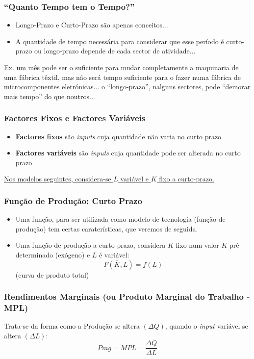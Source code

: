 \begin{frame}
	\frametitle{``Quanto Tempo tem o Tempo?''}
	\begin{itemize}
		\item Longo-Prazo e Curto-Prazo s\~ao apenas conceitos...
		\item A quantidade de tempo necess\'aria para considerar que esse per\'iodo \'e curto-prazo ou longo-prazo depende de cada sector de atividade...
	\end{itemize}

	Ex. um m\^es pode ser o suficiente para mudar completamente a maquinaria de uma f\'abrica t\^extil, mas n\~ao ser\'a tempo suficiente para o fazer numa f\'abrica de microcomponentes eletr\'onicas... o ``longo-prazo'', nalguns sectores, pode ``demorar mais tempo'' do que noutros...
\end{frame}

\begin{frame}
	\frametitle{Factores Fixos e Factores Vari\'aveis}
	\begin{itemize}
		\item \textbf{Factores fixos} s\~ao \emph{inputs} cuja quantidade n\~ao varia no curto prazo
		\item \textbf{Factores vari\'aveis} s\~ao \emph{inputs} cuja quantidade pode ser alterada no curto prazo
	\end{itemize}

	\underline{Nos modelos seguintes, considera-se $L$ vari\'avel e $K$ fixo a curto-prazo.}
\end{frame}

\begin{frame}
	\frametitle{Fun\c c\~ao de Produ\c c\~ao: Curto Prazo}
	\begin{itemize}
		\item Uma fun\c c\~ao, para ser utilizada como modelo de tecnologia (fun\c c\~ao de produ\c c\~ao) tem certas carater\'isticas, que veremos de seguida.
		\item Uma fun\c c\~ao de produ\c c\~ao a curto prazo, considera $K$ fixo num valor $\overline{K}$ pr\'e-determinado (ex\'ogeno) e $L$ \'e vari\'avel:\[F(\overline{K},L)=f(L)\]
		(curva de produto total)
	\end{itemize}
\end{frame}

\begin{frame}
	\frametitle{Rendimentos Marginais (ou Produto Marginal do Trabalho -MPL)}
	Trata-se da forma como a Produ\c c\~ao se altera $(\Delta Q)$, quando o \emph{input} vari\'avel se altera $(\Delta L)$:\[Pmg=MPL=\frac{\Delta Q}{\Delta L}\]
\end{frame}

